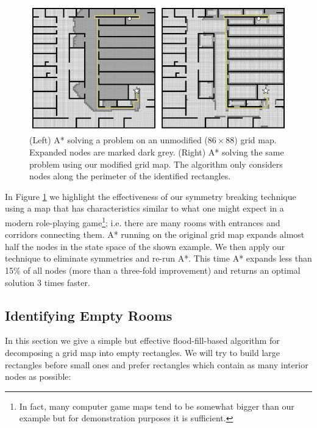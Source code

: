 \begin{figure}[t]
\centering
\includegraphics[width=0.95\columnwidth, trim = 10mm 10mm 10mm 0mm]{chapter_rsr/diagrams/rsr_example.png}
\caption[Searching with A{*} vs. A{*} + RSR] 
{\small
(Left) A* solving a problem on an unmodified ($86\times88$) grid map. 
Expanded nodes are marked dark grey.
(Right) A* solving the same problem using our modified grid map. 
The algorithm only considers nodes along the perimeter of the identified rectangles.}
\label{fig::rsr::contrast}
\end{figure}

In Figure \ref{fig::rsr::contrast} we highlight the effectiveness of our
symmetry breaking technique using a map that has characteristics similar to
what one might expect in a modern role-playing game\footnote{In fact, many
computer game maps tend to be somewhat bigger than our example but for
demonstration purposes it is sufficient.}; i.e. there are many rooms with
entrances and corridors connecting them.  A* running on the original grid map
expands almost half the nodes in the state space of the shown example.  We
then apply our technique to eliminate symmetries and re-run A*.  This time A*
expands less than 15\% of all nodes (more than a three-fold improvement) and
returns an optimal solution 3 times faster.

\subsection{Identifying Empty Rooms}
\label{cha::rsr::rectangles}
In this section we give a simple but effective flood-fill-based algorithm for decomposing a 
grid map into empty rectangles.
We will try to build large rectangles before small ones and prefer rectangles which
contain as many interior nodes as possible:

